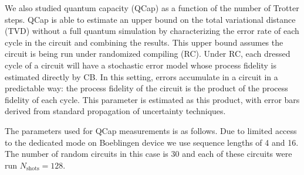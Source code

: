 We also studied quantum capacity (QCap) as a function of the number of Trotter steps. QCap is able to estimate an upper bound on the total variational distance (TVD) without a full quantum simulation by characterizing the error rate of each cycle in the circuit and combining the results. This upper bound assumes the circuit is being run under randomized compiling (RC). Under RC, each dressed cycle of a circuit will have a stochastic error model whose process fidelity is estimated directly by CB. In this setting, errors accumulate in a circuit in a predictable way: the process fidelity of the circuit is the product of the process fidelity of each cycle. This parameter is estimated as this product, with error bars derived from standard propagation of uncertainty techniques. {\color{red}{KYA: Cite QB website.}}







The parameters used for QCap measurements is as follows. Due to limited access to the dedicated mode on Boeblingen device we use sequence lengths of 4 and 16. The number of random circuits in this case is 30 and each of these circuits were run $N_{\text{shots}}=128$. 

